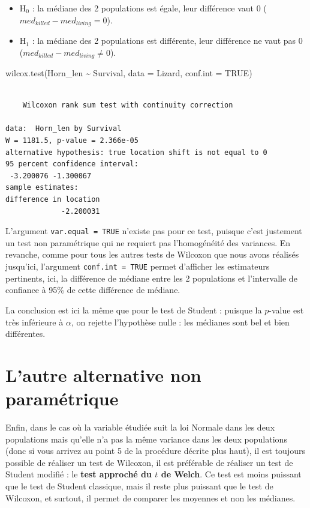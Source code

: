 \documentclass[
  a4paper,
  DIV=11,
  numbers=noendperiod,
  oneside]{scrreprt}
\newenvironment{Shaded}{}{}
\newcommand{\AttributeTok}[1]{\textcolor[rgb]{0.84,0.23,0.29}{#1}}
\newcommand{\ConstantTok}[1]{\textcolor[rgb]{0.00,0.36,0.77}{#1}}
\newcommand{\FunctionTok}[1]{\textcolor[rgb]{0.44,0.26,0.76}{#1}}
\newcommand{\NormalTok}[1]{\textcolor[rgb]{0.14,0.16,0.18}{#1}}
\newcommand{\SpecialCharTok}[1]{\textcolor[rgb]{0.00,0.36,0.77}{#1}}
\providecommand{\tightlist}{%
  \setlength{\itemsep}{0pt}\setlength{\parskip}{0pt}}\usepackage{longtable,booktabs,array}
\begin{document}
\begin{itemize}
\tightlist
\item
  H\(_0\) : la médiane des 2 populations est égale, leur différence vaut
  0 (\(med_{killed}-med_{living} = 0\)).
\item
  H\(_1\) : la médiane des 2 populations est différente, leur différence
  ne vaut pas 0 (\(med_{killed}-med_{living}\neq 0\)).
\end{itemize}

\begin{Shaded}
\begin{Highlighting}[]
\FunctionTok{wilcox.test}\NormalTok{(Horn\_len }\SpecialCharTok{\textasciitilde{}}\NormalTok{ Survival, }\AttributeTok{data =}\NormalTok{ Lizard, }\AttributeTok{conf.int =} \ConstantTok{TRUE}\NormalTok{)}
\end{Highlighting}
\end{Shaded}

\begin{verbatim}

    Wilcoxon rank sum test with continuity correction

data:  Horn_len by Survival
W = 1181.5, p-value = 2.366e-05
alternative hypothesis: true location shift is not equal to 0
95 percent confidence interval:
 -3.200076 -1.300067
sample estimates:
difference in location 
             -2.200031 
\end{verbatim}

L'argument \texttt{var.equal\ =\ TRUE} n'existe pas pour ce test,
puisque c'est justement un test non paramétrique qui ne requiert pas
l'homogénéité des variances. En revanche, comme pour tous les autres
tests de Wilcoxon que nous avons réalisés jusqu'ici, l'argument
\texttt{conf.int\ =\ TRUE} permet d'afficher les estimateurs pertinents,
ici, la différence de médiane entre les 2 populations et l'intervalle de
confiance à 95\% de cette différence de médiane.

La conclusion est ici la même que pour le test de Student : puisque la
\(p\)-value est très inférieure à \(\alpha\), on rejette l'hypothèse
nulle : les médianes sont bel et bien différentes.

\hypertarget{lautre-alternative-non-paramuxe9trique}{%
\section{L'autre alternative non
paramétrique}\label{lautre-alternative-non-paramuxe9trique}}

Enfin, dans le cas où la variable étudiée suit la loi Normale dans les
deux populations mais qu'elle n'a pas la même variance dans les deux
populations (donc si vous arrivez au point 5 de la procédure décrite
plus haut), il est toujours possible de réaliser un test de Wilcoxon, il
est préférable de réaliser un test de Student modifié : le \textbf{test
approché du \(t\) de Welch}. Ce test est moins puissant que le test de
Student classique, mais il reste plus puissant que le test de Wilcoxon,
et surtout, il permet de comparer les moyennes et non les médianes.
\end{document}
